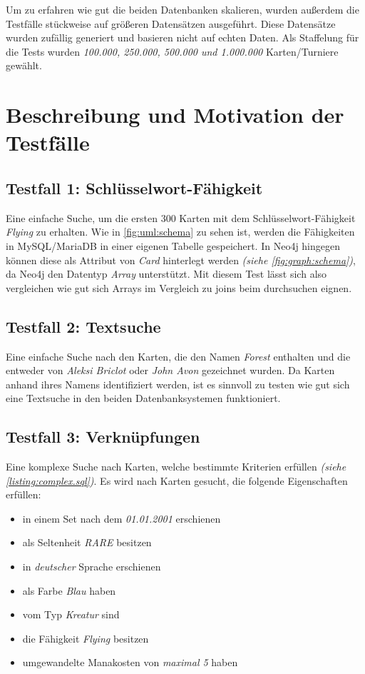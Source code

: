 Um zu erfahren wie gut die beiden Datenbanken skalieren, wurden außerdem die Testfälle stückweise auf größeren Datensätzen ausgeführt. Diese Datensätze wurden zufällig generiert und basieren nicht auf echten Daten. Als Staffelung für die Tests wurden \emph{100.000, 250.000, 500.000 und 1.000.000} Karten/Turniere gewählt.

\section{Beschreibung und Motivation der Testfälle}

\subsection{Testfall 1: Schlüsselwort-Fähigkeit}
Eine einfache Suche, um die ersten 300 Karten mit dem Schlüsselwort-Fähigkeit \emph{Flying} zu erhalten. Wie in \autoref{fig:uml:schema} zu sehen ist, werden die Fähigkeiten in MySQL/MariaDB in einer eigenen Tabelle gespeichert. In Neo4j hingegen können diese als Attribut von \emph{Card} hinterlegt werden \emph{(siehe \autoref{fig:graph:schema})}, da Neo4j den Datentyp \emph{Array} unterstützt. Mit diesem Test lässt sich also vergleichen wie gut sich Arrays im Vergleich zu joins beim durchsuchen eignen.
    
\subsection{Testfall 2: Textsuche}
Eine einfache Suche nach den Karten, die den Namen \emph{Forest} enthalten und die entweder von \emph{Aleksi Briclot} oder \emph{John Avon} gezeichnet wurden. Da Karten anhand ihres Namens identifiziert werden, ist es sinnvoll zu testen wie gut sich eine Textsuche in den beiden Datenbanksystemen funktioniert.

\subsection{Testfall 3: Verknüpfungen}
Eine komplexe Suche nach Karten, welche bestimmte Kriterien erfüllen \emph{(siehe \ref{listing:complex.sql})}. Es wird nach Karten gesucht, die folgende Eigenschaften erfüllen:
\begin{itemize}
    \item in einem Set nach dem \emph{01.01.2001} erschienen
    \item als Seltenheit \emph{RARE} besitzen
    \item in \emph{deutscher} Sprache erschienen
    \item als Farbe \emph{Blau} haben
    \item vom Typ \emph{Kreatur} sind
    \item die Fähigkeit \emph{Flying} besitzen
    \item umgewandelte Manakosten von \emph{maximal 5} haben
 \end{itemize} 

